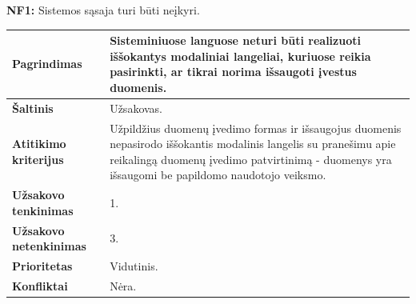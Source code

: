 \documentclass[12pt]{article}
\begin{document}
\noindent \textbf{NF1:} Sistemos sąsaja turi būti neįkyri.
\label{sec:NF1}
\begin{table}[htb!]
    \captionsetup{justification=centering}
    \begin{tabular}{|m{4.9cm}|m{11cm}|}
        \hline
        \raggedleft \textbf{\cellcolor{deepchampagne}Pagrindimas} &
        Sisteminiuose languose neturi būti realizuoti iššokantys modaliniai
        langeliai, kuriuose reikia pasirinkti, ar tikrai norima išsaugoti
        įvestus duomenis. \\
        \hline
        \raggedleft \textbf{\cellcolor{deepchampagne}Šaltinis} & Užsakovas. \\
        \hline
        \raggedleft \textbf{\cellcolor{deepchampagne}Atitikimo kriterijus} & 
        Užpildžius duomenų įvedimo formas ir išsaugojus duomenis nepasirodo
        iššokantis modalinis langelis su pranešimu apie reikalingą duomenų
        įvedimo patvirtinimą - duomenys yra išsaugomi be papildomo naudotojo
        veiksmo. \\
        \hline
        \raggedleft \textbf{\cellcolor{deepchampagne}Užsakovo tenkinimas} & 1. \\
        \hline
        \raggedleft \textbf{\cellcolor{deepchampagne}Užsakovo netenkinimas} & 3. \\
        \hline
        \raggedleft \textbf{\cellcolor{deepchampagne}Prioritetas} & Vidutinis. \\
        \hline
        \raggedleft \textbf{\cellcolor{deepchampagne}Konfliktai} & Nėra. \\
        \hline
    \end{tabular}
\end{table}
\end{document}
